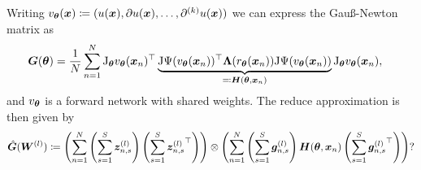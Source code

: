 Writing $v_\vtheta(\vx)\coloneqq (%
u(\vx), \partial u(\vx), \dots, \partial^{(k)} u(\vx))$
we can express the Gauß-Newton matrix as
\begin{align}
    {\bm{G}}({\bm{\theta}}) & = \frac1N\sum_{n=1}^N \mathrm{J}_{\bm{\theta}} v_{\bm{\theta}}({\bm{x}}_n)^\top \underbrace{\mathrm{J} \Psi(v_{\bm{\theta}}({\bm{x}}_n))^\top {\bm{\Lambda}}(r_{\bm{\theta}}({\bm{x}}_n)) \mathrm{J} \Psi(v_{\bm{\theta}}({\bm{x}}_n))}_{\eqqcolon {\bm{H}}({\bm{\theta}}, {\bm{x}}_n)}  \mathrm{J}_{\bm{\theta}} v_{\bm{\theta}}({\bm{x}}_n),
\end{align}
and $v_{\bm{\theta}}$ is a forward network with shared weights.
The reduce approximation is then given by
\begin{align}
    \hat{{\bm{G}}}({\bm{W}}^{(l)}) \coloneqq \left(\sum_{n=1}^N \left( \sum_{s=1}^S {\bm{z}}^{(l)}_{n,s} \right) \left(\sum_{s=1}^S {{\bm{z}}^{(l)}_{n,s}}^\top\right)\right)\otimes\left(\sum_{n=1}^N\left(\sum_{s=1}^S {\bm{g}}^{(l)}_{n,s} \right) {\bm{H}}({\bm{\theta}}, {\bm{x}}_n) \left( \sum_{s=1}^S {{\bm{g}}^{(l)}_{n,s}}^\top \right) \right)?
\end{align}






